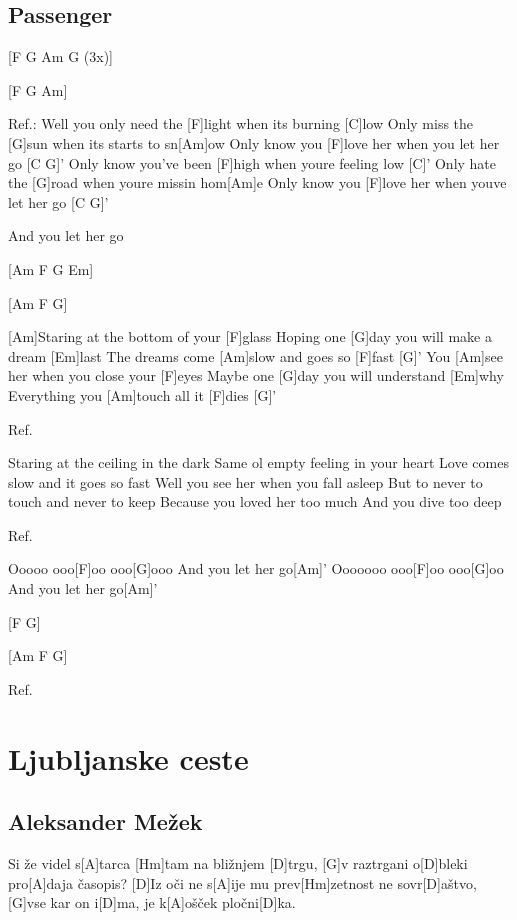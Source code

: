 \documentclass[a4paper,12pt]{article}
\begin{document}
\begin{multicols}{2}
\subsection*{Passenger}
\begin{guitar}

[F    G   Am   G (3x)]

[F      G      Am]

Ref.:                                               
Well you only need the [F]light 
when its burning [C]low
Only miss the [G]sun 
when its starts to sn[Am]ow
Only know you [F]love her 
when you let her go [C   G]'
Only know you’ve been [F]high 
when youre feeling low [C]'
Only hate the [G]road 
when youre missin hom[Am]e
Only know you [F]love her 
when youve let her go [C   G]'

And you let her go




[Am     F     G     Em]

[Am    F     G]




[Am]Staring at the bottom of your [F]glass
Hoping one [G]day you will make a dream [Em]last
The dreams come [Am]slow and goes so [F]fast [G]'
You [Am]see her when you close your [F]eyes
Maybe one [G]day you will understand [Em]why
Everything you [Am]touch all it [F]dies [G]'



Ref.



Staring at the ceiling in the dark
Same ol empty feeling in your heart
Love comes slow and it goes so fast
Well you see her when you fall asleep
But to never to touch and never to keep
Because you loved her too much
And you dive too deep



Ref.



Ooooo ooo[F]oo ooo[G]ooo
And you let her go[Am]'
Ooooooo ooo[F]oo ooo[G]oo
And you let her go[Am]'



[F    G]

[Am    F    G]



Ref.

\end{guitar}
\section{Ljubljanske ceste}
\subsection*{Aleksander Mežek}
\begin{guitar}
[D]Si že videl s[A]tarca 
[Hm]tam na bližnjem [D]trgu,
[G]v raztrgani o[D]bleki 
pro[A]daja časopis? 
[D]Iz oči ne s[A]ije mu prev[Hm]zetnost 
ne sovr[D]aštvo,
[G]vse kar on i[D]ma,
je k[A]ošček pločni[D]ka. 



\end{guitar}
\end{multicols}
\end{document}
